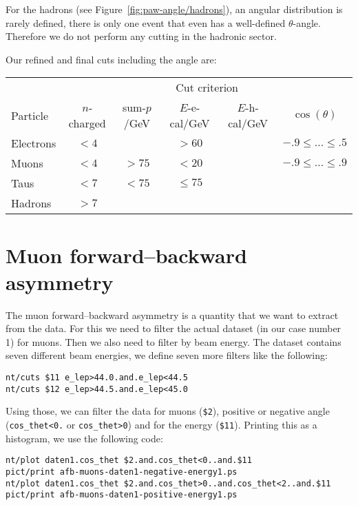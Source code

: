 \documentclass[11pt, english, fleqn, DIV=15, headinclude, BCOR=2cm]{scrreprt}
\newcommand\eecal{$E$-e-cal}
\newcommand\ehcal{$E$-h-cal}
\newcommand\sump{sum-$p$}
\newcommand\ncharged{$n$-charged}
\begin{document}
For the hadrons (see Figure~\ref{fig:paw-angle/hadrons}), an angular
distribution is rarely defined, there is only one event that even has a
well-defined $\theta$-angle. Therefore we do not perform any cutting in the
hadronic sector.

\needspace{20ex}

Our refined and final cuts including the angle are:

\begin{tabular}{lccccc}
    \toprule
    & \multicolumn{5}{c}{Cut criterion} \\
    \cmidrule(l){2-6}
    Particle
    & \ncharged
    & \sump/\si{\giga\electronvolt}
    & \eecal/\si{\giga\electronvolt}
    & \ehcal/\si{\giga\electronvolt}
    & $\cos(\theta)$
    \\
    \midrule
    Electrons & $< 4$ &  & $> 60$ &  & $\num{-.9}\leq\dots\leq\num{.5}$ \\
    Muons & $< 4$ & $> 75$ & $< 20$ &  & $\num{-.9}\leq\dots\leq\num{.9}$ \\
    Taus & $< 7$ & $< 75$ & $\leq 75$ &  &\\
    Hadrons & $> 7$ &  &  &  & \\
    \bottomrule
\end{tabular}

\section{Muon forward--backward asymmetry}

The muon forward--backward asymmetry is a quantity that we want to extract from
the data. For this we need to filter the actual dataset (in our case number 1)
for muons. Then we also need to filter by beam energy. The dataset contains
seven different beam energies, we define seven more filters like the following:

\begin{lstlisting}
nt/cuts $11 e_lep>44.0.and.e_lep<44.5
nt/cuts $12 e_lep>44.5.and.e_lep<45.0
\end{lstlisting}

Using those, we can filter the data for muons (\texttt{\$2}), positive or
negative angle (\texttt{cos\_thet<0.} or \texttt{cos\_thet>0}) and for the energy (\texttt{\$11}). Printing this as
a histogram, we use the following code:

\begin{lstlisting}
nt/plot daten1.cos_thet $2.and.cos_thet<0..and.$11
pict/print afb-muons-daten1-negative-energy1.ps
nt/plot daten1.cos_thet $2.and.cos_thet>0..and.cos_thet<2..and.$11
pict/print afb-muons-daten1-positive-energy1.ps
\end{lstlisting}
\end{document}
